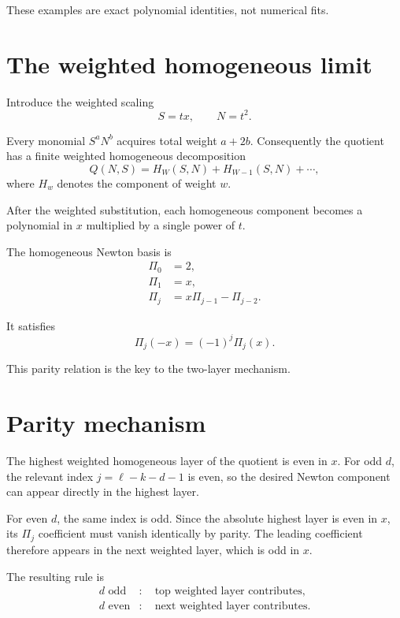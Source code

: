 \documentclass[11pt,a4paper]{article}
\begin{document}
These examples are exact polynomial identities, not numerical fits.

\section{The weighted homogeneous limit}

Introduce the weighted scaling
\begin{equation}
S=tx,\qquad N=t^2.
\end{equation}

Every monomial $S^aN^b$ acquires total weight $a+2b$. Consequently the quotient has a finite weighted homogeneous decomposition
\begin{equation}
Q(N,S)=H_W(S,N)+H_{W-1}(S,N)+\cdots,
\end{equation}
where $H_w$ denotes the component of weight $w$.

After the weighted substitution, each homogeneous component becomes a polynomial in $x$ multiplied by a single power of $t$.

The homogeneous Newton basis is
\begin{align}
\Pi_0&=2,\\
\Pi_1&=x,\\
\Pi_j&=x\Pi_{j-1}-\Pi_{j-2}.
\end{align}

It satisfies
\begin{equation}
\Pi_j(-x)=(-1)^j\Pi_j(x).
\end{equation}

This parity relation is the key to the two-layer mechanism.

\section{Parity mechanism}

The highest weighted homogeneous layer of the quotient is even in $x$. For odd $d$, the relevant index $j=\ell-k-d-1$ is even, so the desired Newton component can appear directly in the highest layer.

For even $d$, the same index is odd. Since the absolute highest layer is even in $x$, its $\Pi_j$ coefficient must vanish identically by parity. The leading coefficient therefore appears in the next weighted layer, which is odd in $x$.

The resulting rule is
\begin{equation}
\boxed{
\begin{aligned}
d\text{ odd}&:\quad \text{top weighted layer contributes},\\
d\text{ even}&:\quad \text{next weighted layer contributes}.
\end{aligned}
}
\end{equation}
\end{document}
